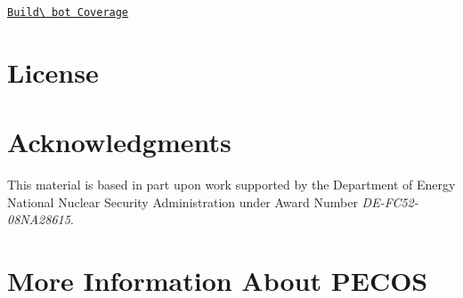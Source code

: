 \begin{DoxyItemize}
\item \href{http://buildbot.ices.utexas.edu/docs/buildbot/queso-branch/build/docs/html/lcov/build/src/index.html}{\tt Build\textbackslash{} bot Coverage}


\end{DoxyItemize}\hypertarget{index_licence}{}\section{License}\label{index_licence}
\hypertarget{index_acknowledgements}{}\section{Acknowledgments}\label{index_acknowledgements}
This material is based in part upon work supported by the Department of Energy National Nuclear Security Administration under Award Number {\itshape D\-E-\/\-F\-C52-\/08\-N\-A28615}.\hypertarget{index_pecos-center}{}\section{More Information About P\-E\-C\-O\-S}\label{index_pecos-center}
